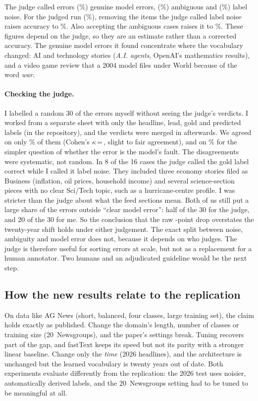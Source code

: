\documentclass[11pt]{article}
\begin{document}
The judge called \JudgeModel{} errors (\JudgeModelPct\%) genuine model errors, \JudgeAmb{}
(\JudgeAmbPct\%) ambiguous and \JudgeNoise{} (\JudgeNoisePct\%) label noise. For the judged run
(\XFseedZero\%), removing the items the judge called label noise raises accuracy to
\XFnoNoise\%. Also accepting the ambiguous cases raises it to \XFlenient\%. These figures depend
on the judge, so they are an estimate rather than a corrected accuracy. The genuine model
errors it found concentrate where the vocabulary changed: AI and technology stories
(\emph{A.I. agents}, OpenAI's mathematics results), and a video game review that a 2004 model
files under World because of the word \emph{war}.

\paragraph{Checking the judge.} I labelled a random 30 of the errors myself without seeing the
judge's verdicts. I worked from a separate sheet with only the headline, lead, gold and
predicted labels (in the repository), and the verdicts were merged in afterwards. We agreed on only \HumanAgree\% of them (Cohen's $\kappa$\,=\,\HumanKappa,
slight to fair agreement), and on \HumanBinary\% for the simpler question of whether the error
is the model's fault. The disagreements were systematic, not random. In 8 of the 16 cases the
judge called the gold label correct while I called it label noise. They included three economy
stories filed as Business (inflation, oil prices, household income) and several
science-section pieces with no clear Sci/Tech topic, such as a hurricane-centre profile. I was stricter than
the judge about what the feed sections mean. Both of us still put a large share of the errors
outside ``clear model error'': half of the 30 for the judge, and 20 of the 30 for me. So the
conclusion that the raw \XFdrop-point drop overstates the twenty-year shift holds under either
judgement. The exact split between noise, ambiguity and model error does not, because it
depends on who judges. The judge is therefore useful for sorting errors at scale, but not as a
replacement for a human annotator. Two humans and an adjudicated guideline would be the next
step.

\subsection{How the new results relate to the replication}
On data like AG News (short, balanced, four classes, large training set), the claim holds
exactly as published. Change the domain's length, number of classes or training size
(20~Newsgroups), and the paper's settings break. Tuning recovers part of the gap, and fastText
keeps its speed but not its parity with a stronger linear baseline. Change only the
\emph{time} (2026 headlines), and the architecture is unchanged but the learned vocabulary is
twenty years out of date. Both experiments evaluate differently from the replication: the
2026 test uses noisier, automatically derived labels, and the 20~Newsgroups setting had to be
tuned to be meaningful at all.
\end{document}
